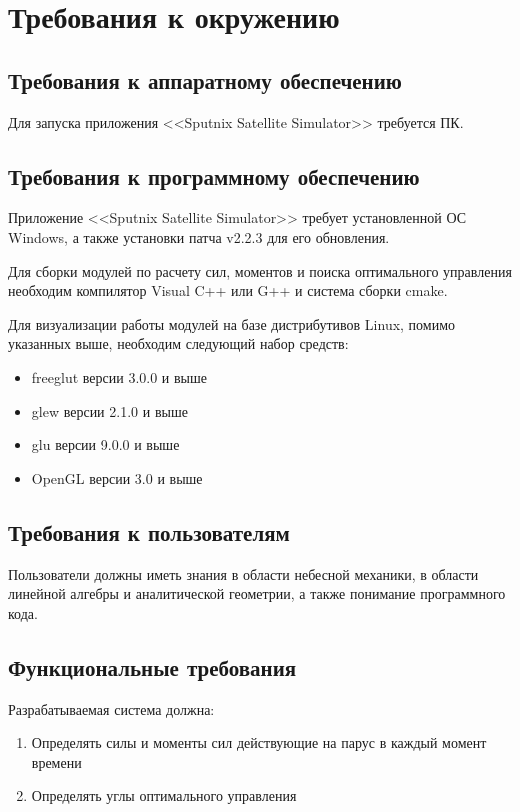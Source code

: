 \chapter{Требования к окружению}
\section{Требования к аппаратному обеспечению}
\noindent\indent Для запуска приложения <<Sputnix Satellite Simulator>> требуется
ПК.
\section{Требования к программному обеспечению}
\noindent\indent Приложение <<Sputnix Satellite Simulator>> требует установленной
ОС Windows, а также установки патча v2.2.3 для его обновления.\par
Для сборки модулей по расчету сил, моментов и поиска оптимального
управления необходим компилятор Visual C++ или G++ и система сборки cmake.\par
Для визуализации работы модулей на базе дистрибутивов Linux, помимо
указанных выше, необходим следующий набор средств:
\begin{itemize}
  \item freeglut версии 3.0.0 и выше
  \item glew версии 2.1.0 и выше
  \item glu версии 9.0.0 и выше
  \item OpenGL версии 3.0 и выше
\end{itemize}
\section{Требования к пользователям}
\noindent\indent Пользователи должны иметь знания в области небесной механики,
в области линейной алгебры и аналитической геометрии, а также понимание программного
кода.
\section{Функциональные требования}
\noindent\indent Разрабатываемая система должна:
\begin{enumerate}
  \item Определять силы и моменты сил действующие на парус в каждый момент времени
  \item Определять углы оптимального управления
\end{enumerate}
